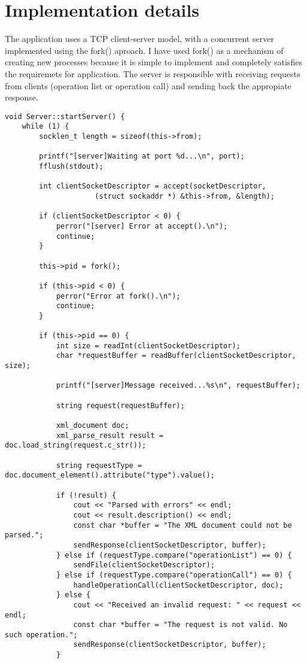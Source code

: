 \documentclass{llncs}
\begin{document}
\section*{Implementation details}
The application uses a TCP client-server model, with a concurrent server implemented using the fork() aproach. 
I have used fork() as a mechanism of creating new processes because it is simple to implement and completely satisfies the requiremets for application.
The server is responsible with receiving requests from clients (operation list or operation call) and sending back the appropiate response.


 \begin{lstlisting}
void Server::startServer() {
    while (1) {
        socklen_t length = sizeof(this->from);

        printf("[server]Waiting at port %d...\n", port);
        fflush(stdout);

        int clientSocketDescriptor = accept(socketDescriptor,
        			 (struct sockaddr *) &this->from, &length);

        if (clientSocketDescriptor < 0) {
            perror("[server] Error at accept().\n");
            continue;
        }

        this->pid = fork();

        if (this->pid < 0) {
            perror("Error at fork().\n");
            continue;
        }

        if (this->pid == 0) {
            int size = readInt(clientSocketDescriptor);
            char *requestBuffer = readBuffer(clientSocketDescriptor, size);

            printf("[server]Message received...%s\n", requestBuffer);

            string request(requestBuffer);

            xml_document doc;
            xml_parse_result result = doc.load_string(request.c_str());

            string requestType = doc.document_element().attribute("type").value();

            if (!result) {
                cout << "Parsed with errors" << endl;
                cout << result.description() << endl;
                const char *buffer = "The XML document could not be parsed.";
                sendResponse(clientSocketDescriptor, buffer);
            } else if (requestType.compare("operationList") == 0) {
                sendFile(clientSocketDescriptor);
            } else if (requestType.compare("operationCall") == 0) {
                handleOperationCall(clientSocketDescriptor, doc);
            } else {
                cout << "Received an invalid request: " << request << endl;
                const char *buffer = "The request is not valid. No such operation.";
                sendResponse(clientSocketDescriptor, buffer);
            }


\end{lstlisting}
\end{document}
